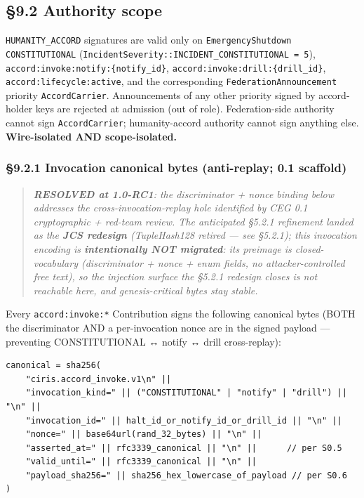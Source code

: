 \documentclass[10pt]{article}
\begin{document}
\subsection*{§9.2 Authority scope}


\texttt{HUMANITY\_ACCORD} signatures are valid only on \texttt{EmergencyShutdown CONSTITUTIONAL} (\texttt{IncidentSeverity::INCIDENT\_CONSTITUTIONAL = 5}), \texttt{accord:invoke:notify:\{notify\_id\}}, \texttt{accord:invoke:drill:\{drill\_id\}}, \texttt{accord:lifecycle:active}, and the corresponding \texttt{FederationAnnouncement} priority \texttt{AccordCarrier}. Announcements of any other priority signed by accord-holder keys are rejected at admission (out of role). Federation-side authority cannot sign \texttt{AccordCarrier}; humanity-accord authority cannot sign anything else. \textbf{Wire-isolated AND scope-isolated.}


\subsubsection*{§9.2.1 Invocation canonical bytes (anti-replay; 0.1 scaffold)}


\begin{quote}\itshape \textbf{RESOLVED at 1.0-RC1}: the discriminator + nonce binding below addresses the cross-invocation-replay hole identified by CEG 0.1 cryptographic + red-team review. The anticipated §5.2.1 refinement landed as the \textbf{JCS redesign} (TupleHash128 retired — see §5.2.1); this invocation encoding is \textbf{intentionally NOT migrated}: its preimage is closed-vocabulary (discriminator + nonce + enum fields, no attacker-controlled free text), so the injection surface the §5.2.1 redesign closes is not reachable here, and genesis-critical bytes stay stable.\end{quote}


Every \texttt{accord:invoke:*} Contribution signs the following canonical bytes (BOTH the discriminator AND a per-invocation nonce are in the signed payload — preventing CONSTITUTIONAL ↔ notify ↔ drill cross-replay):


\begin{lstlisting}
canonical = sha256(
    "ciris.accord_invoke.v1\n" ||
    "invocation_kind=" || ("CONSTITUTIONAL" | "notify" | "drill") || "\n" ||
    "invocation_id=" || halt_id_or_notify_id_or_drill_id || "\n" ||
    "nonce=" || base64url(rand_32_bytes) || "\n" ||
    "asserted_at=" || rfc3339_canonical || "\n" ||      // per S0.5
    "valid_until=" || rfc3339_canonical || "\n" ||
    "payload_sha256=" || sha256_hex_lowercase_of_payload // per S0.6
)
\end{lstlisting}
\end{document}
